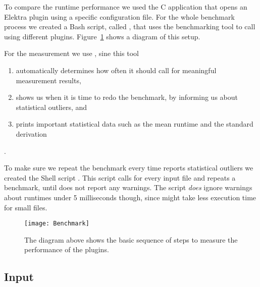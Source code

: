 To compare the runtime performance we used the C application \FilePluginGetSet{} that opens an Elektra plugin using a specific configuration file. For the whole benchmark process we created a Bash script, called \FileBenchmarkYAML{}, that uses the benchmarking tool \ToolHyperfine{} to call \FilePluginGetSet{} using different  plugins. Figure~\ref{fig:benchmark} shows a diagram of this setup.

For the measurement we use \ToolHyperfine{}, sine this tool

\begin{enumerate}
  \item automatically determines how often it should call \FilePluginGetSet{} for meaningful measurement results,
  \item shows us when it is time to redo the benchmark, by informing us about statistical outliers, and
  \item prints important statistical data such as the mean runtime and the standard derivation
\end{enumerate}

.

To make sure we repeat the benchmark every time \href{https://github.com/sharkdp/hyperfine}{} reports statistical outliers we created the Shell script \FileBenchmarkRuntime{}. This script calls \FileBenchmarkYAML{} for every input file and repeats a benchmark, until \href{https://github.com/sharkdp/hyperfine}{} does not report any warnings. The script \FileBenchmarkRuntime{} \emph{does} ignore warnings about runtimes under 5 milliseconds though, since \FilePluginGetSet{} might take less execution time for small  files.

\begin{figure}[H]
  \centering
    \texttt{[image: Benchmark]}
  \caption{The diagram above shows the basic sequence of steps to measure the performance of the  plugins.}
  \label{fig:benchmark}
\end{figure}

\subsection{Input}

\newcommand{\URLKeyFramesJSON}{https://master.libelektra.org/src/plugins/yajl/yajl/keyframes_complex.json}

